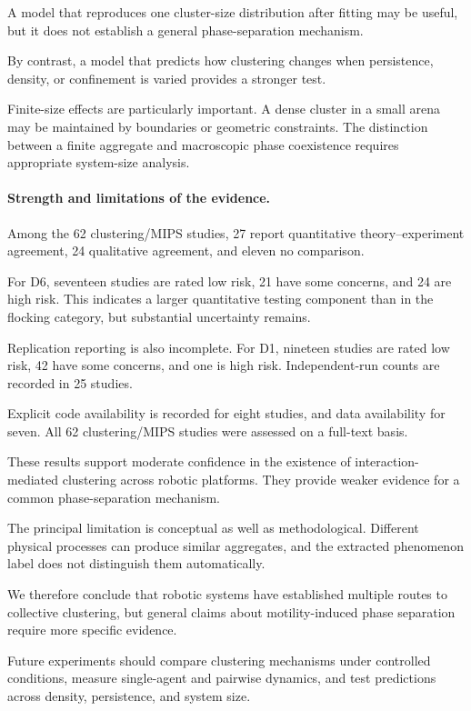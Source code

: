 A model that reproduces
one cluster-size distribution
after fitting may be useful,
but it does not establish
a general phase-separation
mechanism.

By contrast, a model that
predicts how clustering
changes when persistence,
density, or confinement
is varied provides
a stronger test.

Finite-size effects are
particularly important.
A dense cluster in a
small arena may be
maintained by boundaries
or geometric constraints.
The distinction between
a finite aggregate and
macroscopic phase coexistence
requires appropriate
system-size analysis.

\paragraph*{Strength and limitations of the evidence.}

Among the 62 clustering/MIPS studies,
27 report quantitative theory--experiment
agreement, 24 qualitative agreement,
and eleven no comparison.

For D6, seventeen studies are
rated low risk, 21 have
some concerns, and 24
are high risk.
This indicates a larger
quantitative testing component
than in the flocking category,
but substantial uncertainty
remains.

Replication reporting is
also incomplete. For D1,
nineteen studies are rated
low risk, 42 have some
concerns, and one is
high risk. Independent-run
counts are recorded in
25 studies.

Explicit code availability
is recorded for eight
studies, and data
availability for seven.
All 62 clustering/MIPS
studies were assessed
on a full-text basis.

These results support
moderate confidence in
the existence of
interaction-mediated
clustering across
robotic platforms.
They provide weaker
evidence for a
common phase-separation
mechanism.

The principal limitation
is conceptual as well
as methodological.
Different physical
processes can produce
similar aggregates,
and the extracted
phenomenon label does
not distinguish
them automatically.

We therefore conclude
that robotic systems
have established
multiple routes
to collective
clustering, but
general claims
about motility-induced
phase separation
require more
specific evidence.

Future experiments
should compare
clustering mechanisms
under controlled
conditions, measure
single-agent and
pairwise dynamics,
and test predictions
across density,
persistence, and
system size.

